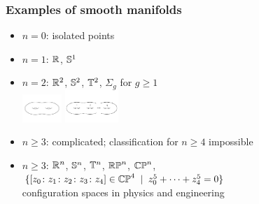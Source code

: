 \begin{frame} %
  \frametitle{Examples of smooth manifolds}
  \begin{itemize}
  \item $n=0$: isolated points
  \item $n=1$: $\mathbb{R}$, $\mathbb{S}^{1}$
  \item $n=2$: $\mathbb{R}^2$, $\mathbb{S}^{2}$, $\mathbb{T}^2$, $\Sigma_g$ for $g\geq 1$\\
  \includegraphics[width=1.5cm]{images/surface_genus_2.png}
  \includegraphics[width=2cm]{images/surface_genus_g.png}\pause
  \item $n\geq 3$: complicated; classification for $n\geq 4$ impossible
  \item $n\geq 3$: $\mathbb{R}^n$, $\mathbb{S}^{n}$, $\mathbb{T}^{n}$, $\mathbb{RP}^{n}$, $\mathbb{CP}^{n}$, $\{ [z_0\colon z_1\colon z_2\colon z_3\colon z_4]\in\mathbb{CP}^{4}\;\mid\; z_0^5+\dots+z_4^5=0\}$\\
  configuration spaces in physics and engineering
  \end{itemize}
\end{frame}

